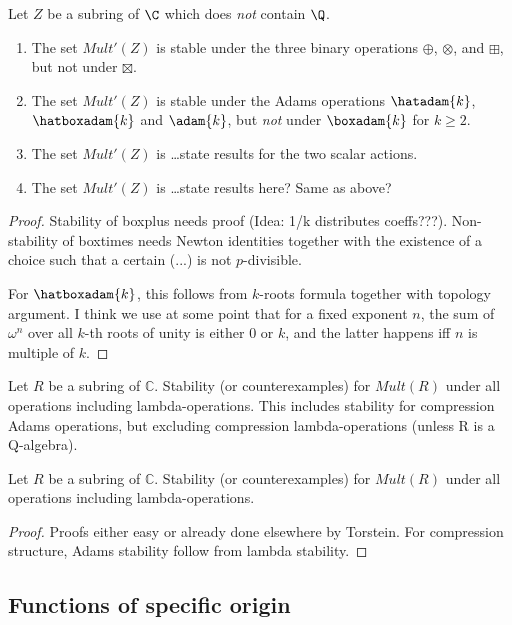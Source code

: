 \begin{theorem}
Let $Z$ be a subring of $\C$ which does \emph{not} contain $\Q$.
\begin{enumerate}
\item The set $Mult'(Z)$ is stable under the three binary operations $\oplus$, $\otimes$, and $\boxplus$, but not under $\boxtimes$.
\item The set $Mult'(Z)$ is stable under the Adams operations $\hatadam{k}$, $\hatboxadam{k}$ and $\adam{k}$, but \emph{not} under $\boxadam{k}$ for $k \geq 2$. 
\item The set $Mult'(Z)$ is \ldots state results for the two scalar actions.
\item The set $Mult'(Z)$ is \ldots state results here? Same as above?
\end{enumerate}
\end{theorem}

\begin{proof}
Stability of boxplus needs proof (Idea: 1/k distributes coeffs???). Non-stability of boxtimes needs Newton identities together with the existence of a choice such that a certain (...) is not $p$-divisible.

For $\hatboxadam{k}$, this follows from $k$-roots formula together with topology argument. I think we use at some point that for a fixed exponent $n$, the sum of $\omega^n$ over all $k$-th roots of unity is either 0 or $k$, and the latter happens iff $n$ is multiple of $k$. 
\end{proof}


\begin{theorem}
Let $R$ be a subring of $\mathbb{C}$. Stability (or counterexamples) for $Mult(R)$ under all operations including lambda-operations. This includes stability for compression Adams operations, but excluding compression lambda-operations (unless R is a Q-algebra).
\end{theorem}



\begin{theorem}
Let $R$ be a subring of $\mathbb{C}$. Stability (or counterexamples) for $Mult(R)$ under all operations including lambda-operations.
\end{theorem}
\begin{proof}
Proofs either easy or already done elsewhere by Torstein. For compression structure, Adams stability follow from lambda stability.
\end{proof}


\subsection{Functions of specific origin}

